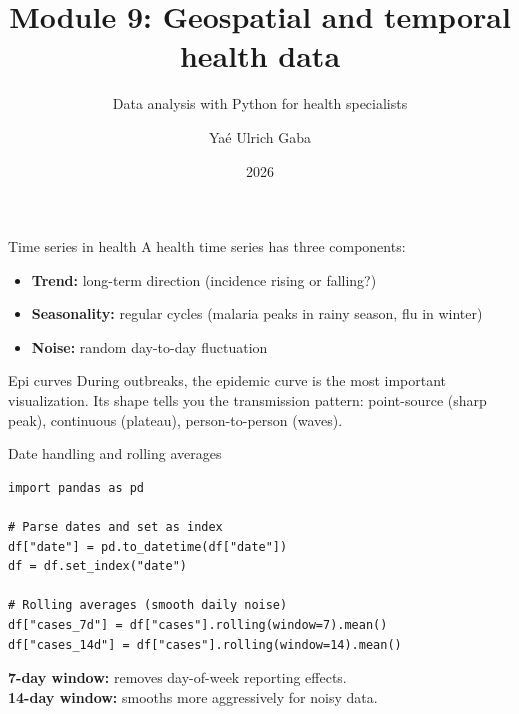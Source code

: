 \documentclass[aspectratio=169,11pt]{beamer}
\title{Module 9: Geospatial and temporal health data}
\subtitle{Data analysis with Python for health specialists}
\author{Yaé Ulrich Gaba}
\institute{AIRINA Labs}
\date{2026}
\begin{document}
\maketitle

\begin{frame}{Time series in health}
A health time series has three components:

\begin{itemize}
  \item \textbf{Trend:} long-term direction (incidence rising or falling?)
  \item \textbf{Seasonality:} regular cycles (malaria peaks in rainy season, flu in winter)
  \item \textbf{Noise:} random day-to-day fluctuation
\end{itemize}

\vspace{6pt}
\begin{exampleblock}{Epi curves}
During outbreaks, the epidemic curve is the \alert{most important visualization}. Its shape tells you the transmission pattern: point-source (sharp peak), continuous (plateau), person-to-person (waves).
\end{exampleblock}
\end{frame}

\begin{frame}[fragile]{Date handling and rolling averages}
\begin{verbatim}
import pandas as pd

# Parse dates and set as index
df["date"] = pd.to_datetime(df["date"])
df = df.set_index("date")

# Rolling averages (smooth daily noise)
df["cases_7d"] = df["cases"].rolling(window=7).mean()
df["cases_14d"] = df["cases"].rolling(window=14).mean()
\end{verbatim}

\vspace{4pt}
\textbf{7-day window:} removes day-of-week reporting effects.\\
\textbf{14-day window:} smooths more aggressively for noisy data.
\end{frame}
\end{document}
